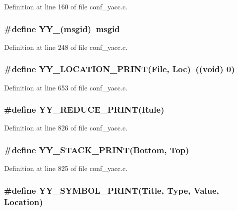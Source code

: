 Definition at line 160 of file conf\_\-yacc.c.
\subsubsection[{YY\_\-}]{\setlength{\rightskip}{0pt plus 5cm}\#define YY\_\-(msgid)~msgid}\label{conf__yacc_8c_a86f079016f11f0600f4259f3f03f8d43}


Definition at line 248 of file conf\_\-yacc.c.
\subsubsection[{YY\_\-LOCATION\_\-PRINT}]{\setlength{\rightskip}{0pt plus 5cm}\#define YY\_\-LOCATION\_\-PRINT(File, \/  Loc)~((void) 0)}\label{conf__yacc_8c_a52c7d936ca7e6c34687ff71f29b8cfd1}


Definition at line 653 of file conf\_\-yacc.c.
\subsubsection[{YY\_\-REDUCE\_\-PRINT}]{\setlength{\rightskip}{0pt plus 5cm}\#define YY\_\-REDUCE\_\-PRINT(Rule)}\label{conf__yacc_8c_a49ad456240785266cadae498ddae9310}


Definition at line 826 of file conf\_\-yacc.c.
\subsubsection[{YY\_\-STACK\_\-PRINT}]{\setlength{\rightskip}{0pt plus 5cm}\#define YY\_\-STACK\_\-PRINT(Bottom, \/  Top)}\label{conf__yacc_8c_a7a52157fbe194e3a347afc4ef750af77}


Definition at line 825 of file conf\_\-yacc.c.
\subsubsection[{YY\_\-SYMBOL\_\-PRINT}]{\setlength{\rightskip}{0pt plus 5cm}\#define YY\_\-SYMBOL\_\-PRINT(Title, \/  Type, \/  Value, \/  Location)}\label{conf__yacc_8c_a1c510d33cb388afc9411141ba3076a36}


